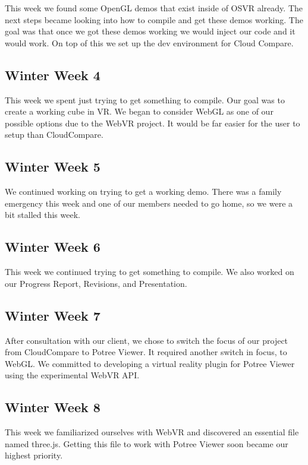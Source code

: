 \documentclass[draftclsnofoot,onecolumn]{IEEEtran}
\begin{document}
This week we found some OpenGL demos that exist inside of OSVR already.
The next steps became looking into how to compile and get these demos working.
The goal was that once we got these demos working we would inject our code and it would work.
On top of this we set up the dev environment for Cloud Compare.

\subsection{Winter Week 4}

This week we spent just trying to get something to compile.
Our goal was to create a working cube in VR.
We began to consider WebGL as one of our possible options due to the WebVR project. 
It would be far easier for the user to setup than CloudCompare.

\subsection{Winter Week 5}

We continued working on trying to get a working demo.
There was a family emergency this week and one of our members needed to go home, so we were a bit stalled this week.

\subsection{Winter Week 6}

This week we continued trying to get something to compile.
We also worked on our Progress Report, Revisions, and Presentation.

\subsection{Winter Week 7}

After consultation with our client, we chose to switch the focus of our project from CloudCompare to Potree Viewer. 
It required another switch in focus, to WebGL. 
We committed to developing a virtual reality plugin for Potree Viewer using the experimental WebVR API.

\subsection{Winter Week 8}

This week we familiarized ourselves with WebVR and discovered an essential file named three.js. 
Getting this file to work with Potree Viewer soon became our highest priority.
\end{document}
